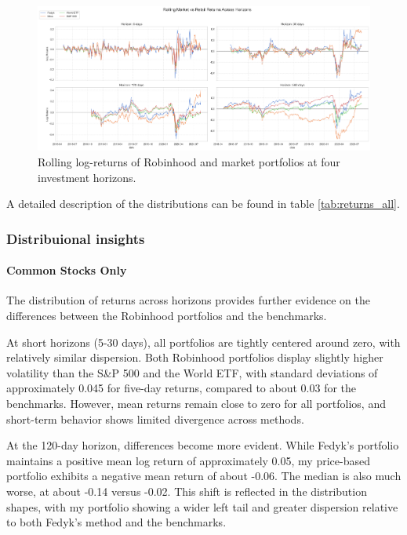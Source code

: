 \begin{figure}[H]
    \centering
    \includegraphics[width=1\linewidth]
    {../images/returns/comparison_2.png}
    \caption{Rolling log-returns of Robinhood and market portfolios at four investment horizons.}
\end{figure}

A detailed description of the distributions can be found in table \ref{tab:returns_all}.

\subsubsection{Distribuional insights}
\paragraph{Common Stocks Only}

The distribution of returns across horizons provides further evidence on the differences between the Robinhood portfolios and the benchmarks.

At short horizons (5-30 days), all portfolios are tightly centered around zero, with relatively similar dispersion. 
Both Robinhood portfolios display slightly higher volatility than the S\&P 500 and the World ETF, with standard deviations of approximately 0.045 for five-day returns, compared to about 0.03 for the benchmarks. 
However, mean returns remain close to zero for all portfolios, and short-term behavior shows limited divergence across methods.

At the 120-day horizon, differences become more evident. 
While Fedyk's portfolio maintains a positive mean log return of approximately 0.05, my price-based portfolio exhibits a negative mean return of about -0.06. 
The median is also much worse, at about -0.14 versus -0.02.
This shift is reflected in the distribution shapes, with my portfolio showing a wider left tail and greater dispersion relative to both Fedyk's method and the benchmarks.

